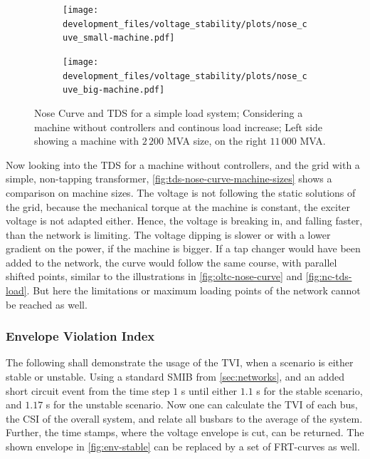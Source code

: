 \begin{figure}[htbp!]
    \centering
    \begin{subfigure}[b]{.49\linewidth}
        \centering
        \texttt{[image: development\_files/voltage\_stability/plots/nose\_cuve\_small-machine.pdf]}
    \end{subfigure}
    \begin{subfigure}[b]{.49\linewidth}
        \centering
        \texttt{[image: development\_files/voltage\_stability/plots/nose\_cuve\_big-machine.pdf]}
    \end{subfigure}
    \caption[Nose Curve and \acs{TDS} for a simple load system without machine controllers]{Nose Curve and \acs{TDS} for a simple load system; Considering a machine without controllers and continous load increase; Left side showing a machine with $2\,200$ MVA size, on the right $11\,000$ MVA.}
    \label{fig:tds-nose-curve-machine-sizes}
\end{figure}

Now looking into the \acs{TDS} for a machine without controllers, and the grid with a simple, non-tapping transformer, \autoref{fig:tds-nose-curve-machine-sizes} shows a comparison on machine sizes.
The voltage is not following the static solutions of the grid, because the mechanical torque at the machine is constant, the exciter voltage is not adapted either.
Hence, the voltage is breaking in, and falling faster, than the network is limiting.
The voltage dipping is slower or with a lower gradient on the power, if the machine is bigger.
If a tap changer would have been added to the network, the curve would follow the same course, with parallel shifted points, similar to the illustrations in \autoref{fig:oltc-nose-curve} and \autoref{fig:nc-tds-load}.
But here the limitations or maximum loading points of the network cannot be reached as well.

\subsubsection{Envelope Violation Index}

The following shall demonstrate the usage of the \acf{TVI}, when a scenario is either stable or unstable.
Using a standard \acs{SMIB} from \autoref{sec:networks}, and an added short circuit event from the time step $1$ s until either $1.1$ s for the stable scenario, and $1.17$ s for the unstable scenario.
Now one can calculate the \acs{TVI} of each bus, the \acs{CSI} of the overall system, and relate all busbars to the average of the system.
Further, the time stamps, where the voltage envelope is cut, can be returned. 
The shown envelope in \autoref{fig:env-stable} can be replaced by a set of \acs{FRT}-curves as well.

